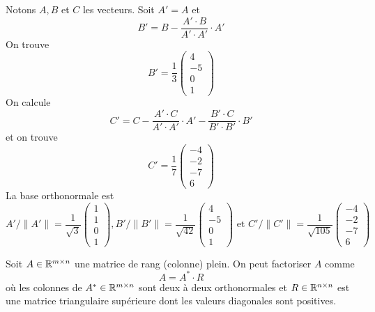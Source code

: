 \begin{example}
Notons $A,B$ et $C$ les vecteurs. Soit $A'=A$ et 
\begin{displaymath}
  B' = B - \frac{A'\cdot B}{A'\cdot A'} \cdot A'
\end{displaymath}
On trouve 
\begin{displaymath}
  B' = \frac{1}{3}
  \begin{pmatrix}
    4\\-5\\0\\1
  \end{pmatrix}
\end{displaymath}
On calcule 
\begin{displaymath}
  C' = C - \frac{A'\cdot C}{A'\cdot A'} \cdot A' - \frac{B'\cdot C}{B'\cdot B'} \cdot B'
\end{displaymath}
et on trouve 
\begin{displaymath}
  C' = \frac{1}{7}
  \begin{pmatrix}
    -4\\-2\\-7\\6
  \end{pmatrix}  
\end{displaymath}
La base orthonormale est
\begin{displaymath}
  A' / \|A'\| = \frac{1}{\sqrt{3}}
  \begin{pmatrix}
    1\\1\\0\\1
  \end{pmatrix},
    B'/ \|B'\| = \frac{1}{\sqrt{42}}
  \begin{pmatrix}
    4\\-5\\0\\1
  \end{pmatrix}
\text{ et }
C'/ \|C'\| = \frac{1}{\sqrt{105}}
  \begin{pmatrix}
    -4\\-2\\-7\\6
  \end{pmatrix}  
\end{displaymath}
\end{example}

\begin{corollary}
  \label{co:2}
  Soit $A \in \mathbb{R}^{m\times n}$ une matrice de rang (colonne) plein. On peut factoriser $A$ comme 
  \begin{displaymath}
    A = A^* \cdot R
  \end{displaymath}
où les colonnes de  $A^* \in \mathbb{R}^{m\times n}$ sont deux à deux orthonormales et $R \in \mathbb{R}^{n \times n}$ est une matrice triangulaire supérieure dont les valeurs diagonales sont positives. 
\end{corollary}

